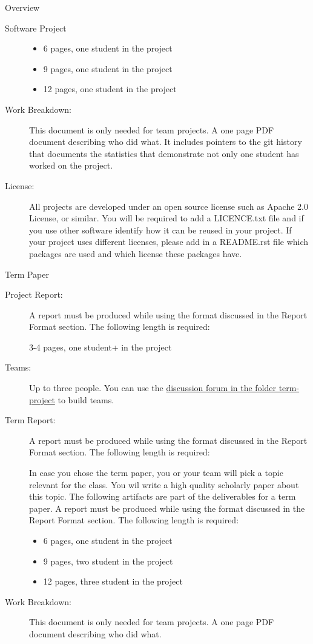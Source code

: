 \begin{edXchapter}{Overview}
\begin{edXsection}{Software Project}
\begin{description}
\begin{itemize}
\itemsep1pt\parskip0pt
\item
  6 pages, one student in the project
\item
  9 pages, one student in the project
\item
  12 pages, one student in the project
\end{itemize}
\item[Work Breakdown:]
This document is only needed for team projects. A one page PDF document
describing who did what. It includes pointers to the git history that
documents the statistics that demonstrate not only one student has
worked on the project.
\item[License:]
All projects are developed under an open source license such as Apache
2.0 License, or similar. You will be required to add a LICENCE.txt file
and if you use other software identify how it can be reused in your
project. If your project uses different licenses, please add in a
README.rst file which packages are used and which license these packages
have.
\end{description}

\end{edXsection}
\begin{edXsection}{Term Paper}\label{term-paper}

\begin{description}
\item[Project Report:]
A report must be produced while using the format discussed in the Report
Format section. The following length is required:

3-4 pages, one student+ in the project​
\item[Teams:]
Up to three people. You can use the
\href{https://piazza.com/class/irqfvh1ctrg2vt}{discussion forum in the
folder term-project} to build teams.
\item[Term Report:]
A report must be produced while using the format discussed in the Report
Format section. The following length is required:

In case you chose the term paper, you or your team will pick a topic
relevant for the class. You wil write a high quality scholarly paper
about this topic. The following artifacts are part of the deliverables
for a term paper. A report must be produced while using the format
discussed in the Report Format section. The following length is
required:

\begin{itemize}
\itemsep1pt\parskip0pt
\item
  6 pages, one student in the project
\item
  9 pages, two student in the project
\item
  12 pages, three student in the project
\end{itemize}
\item[Work Breakdown:]
This document is only needed for team projects. A one page PDF document
describing who did what.
\end{description}


\end{edXsection}
\end{edXchapter}
